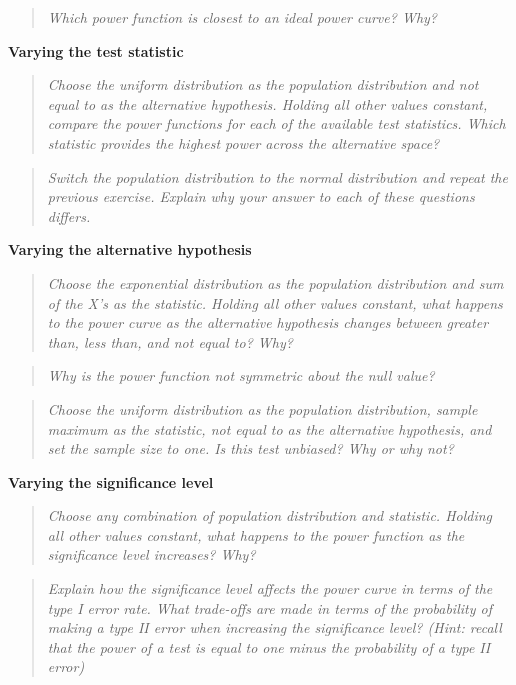 \documentclass{TISE}
\begin{document}
\begin{quote}
	\textit{Which power function is closest to an ideal power curve? Why?}
\end{quote}

\textbf{Varying the test statistic}

\begin{quote}
	\textit{Choose the uniform distribution as the population distribution and not equal to as the alternative hypothesis. Holding all other values constant, compare the power functions for each of the available test statistics. Which statistic provides the highest power across the alternative space?}
\end{quote}

\begin{quote}
	\textit{Switch the population distribution to the normal distribution and repeat the previous exercise. Explain why your answer to each of these questions differs.}
\end{quote}

\textbf{Varying the alternative hypothesis}

\begin{quote}
	\textit{Choose the exponential distribution as the population distribution and sum of the X's as the statistic. Holding all other values constant, what happens to the power curve as the alternative hypothesis changes between greater than, less than, and not equal to? Why?}
\end{quote}

\begin{quote}
	\textit{Why is the power function not symmetric about the null value?}
\end{quote}

\begin{quote}
	\textit{Choose the uniform distribution as the population distribution, sample maximum as the statistic, not equal to as the alternative hypothesis, and set the sample size to one. Is this test unbiased? Why or why not?}
\end{quote}

\textbf{Varying the significance level}

\begin{quote}
	\textit{Choose any combination of population distribution and statistic. Holding all other values constant, what happens to the power function as the significance level increases? Why?}
\end{quote}

\begin{quote}
	\textit{Explain how the significance level affects the power curve in terms of the type I error rate. What trade-offs are made in terms of the probability of making a type II error when increasing the significance level? (Hint: recall that the power of a test is equal to one minus the probability of a type II error)}
\end{quote}
\end{document}
